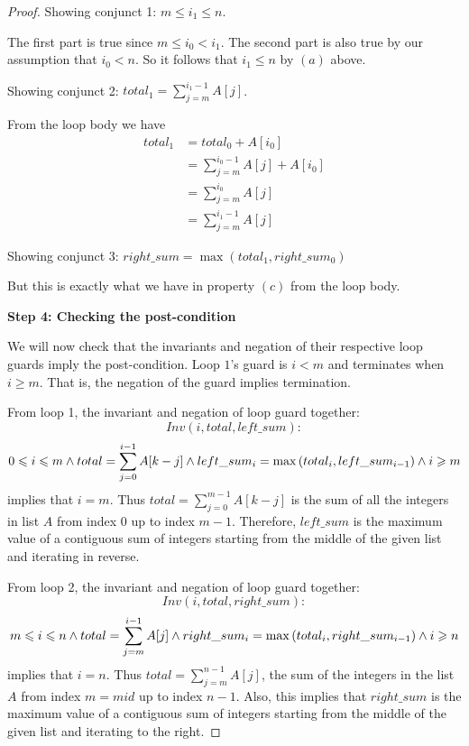 \begin{proof}
    Showing conjunct 1: $m \leqslant i_1 \leqslant n$.
    
    The first part is true since $m \leqslant i_0 < i_1$.
    The second part is also true by our assumption that 
    $i_0 < n$. So it follows that $i_1 \leqslant n$ by $(a)$ above.
    
    \vspace{5mm}
    
    Showing conjunct 2: $total_1 = \sum_{j = m}^{i_1 - 1}A[j]$.
    
    From the loop body we have
    \begin{align*}
        total_1 &= total_0 + A[i_0] \\ 
        &= \sum_{j = m}^{i_0 - 1}A[j] + A[i_0] \tag{by I.H.} \\
        &= \sum_{j = m}^{i_0}A[j] \\
        &= \sum_{j = m}^{i_1 - 1}A[j] \tag{by (a)}
    \end{align*}
    
    Showing conjunct 3: $right\_sum = \max{(total_1, right\_sum_0)}$
    
    But this is exactly what we have in property $(c)$ from the loop body.
    
    \vspace{10mm}
    
    \textbf{Step 4: Checking the post-condition}
    \vspace{5mm}
    
    We will now check that the invariants and negation of their
    respective loop guards imply the post-condition. Loop $1$'s guard
    is $i < m$ and terminates when $i \geqslant m$. That is, the
    negation of the guard implies termination.
    
    From loop 1, the invariant and negation of loop guard together:
    \[
    Inv(i, total, left\_sum): 
    \]
    \[
    0 \leqslant i \leqslant m
    \wedge total = \sum_{j = 0}^{i - 1}A[k - j] 
    \wedge left\_sum_i = \max{(total_i, left\_sum_{i-1})}
    \wedge i \geqslant m
    \]
    implies that $i = m$. Thus $total = \sum_{j = 0}^{m - 1}A[k - j]$
    is the sum of all the integers in list $A$ from index $0$ up to 
    index $m - 1$. Therefore, $left\_sum$ is the maximum value of 
    a contiguous sum of integers starting from the middle of the given 
    list and iterating in reverse.
    
    
    From loop 2, the invariant and negation of loop guard together:
    \[
    Inv(i, total, right\_sum): 
    \]
    \[
    m \leqslant i \leqslant n
    \wedge total = \sum_{j = m}^{i - 1}A[j] 
    \wedge right\_sum_i = \max{(total_i, right\_sum_{i-1})}
    \wedge i \geqslant n
    \]
    implies that $i = n$. Thus $total = \sum_{j = m}^{n - 1}A[j]$, 
    the sum of the integers in the list $A$ from index $m = mid$
    up to index $n - 1$. Also, this implies
    that $right\_sum$ is the maximum value of a contiguous sum of
    integers starting from the middle of the given list and 
    iterating to the right.
    

\end{proof}
